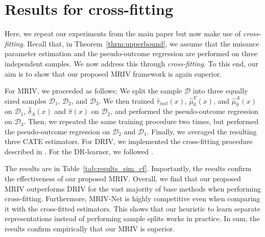 \documentclass{article} %
\newcommand{\frameworkname}{MRIV\xspace}
\newcommand{\modelname}{\mbox{MRIV-Net}\xspace}
\theoremstyle{definition}
\theoremstyle{plain}
\begin{document}
\clearpage

\section{Results for cross-fitting}\label{app:results_cf}

Here, we repeat our experiments from the main paper but now make use of \emph{cross-fitting}. Recall that, in Theorem~\ref{thrm:upperbound}, we assume that the nuisance parameter estimation and the pseudo-outcome regression are performed on three independent samples. We now address this through \emph{cross-fitting}. To this end, our aim is to show that our proposed \frameworkname framework is again superior. 

For \frameworkname, we proceeded as follows: We split the sample $\mathcal{D}$ into three equally sized samples $\mathcal{D}_1$, $\mathcal{D}_2$, and $\mathcal{D}_3$. We then trained $\hat{\tau}_{init}(x)$, $\hat{\mu}_0^Y(x)$, and $\hat{\mu}_0^A(x)$ on $\mathcal{D}_1$, $\hat{\delta}_A(x)$ and $\hat{\pi}(x)$ on $\mathcal{D}_2$, and performed the pseudo-outcome regression on $\mathcal{D}_3$. Then, we repeated the same training procedure two times, but performed the pseudo-outcome regression on $\mathcal{D}_2$ and $\mathcal{D}_1$. Finally, we averaged the resulting three CATE estimators. For DRIV, we implemented the cross-fitting procedure described in \citep{Syrgkanis.2019}. For the DR-learner, we followed \citep{Kennedy.2022d}. 

The results are in Table~\ref{tab:results_sim_cf}. Importantly, the results confirm the effectiveness of our proposed \frameworkname. Overall, we find that our proposed \frameworkname outperforms DRIV for the vast majority of base methods when performing cross-fitting. Furthermore, \modelname is highly competitive even when comparing it with the cross-fitted estimators. This shows that our heuristic to learn separate representations instead of performing sample splits works in practice. In sum, the results confirm empirically that our \frameworkname is superior. 

\vspace{0.5cm}
\end{document}

